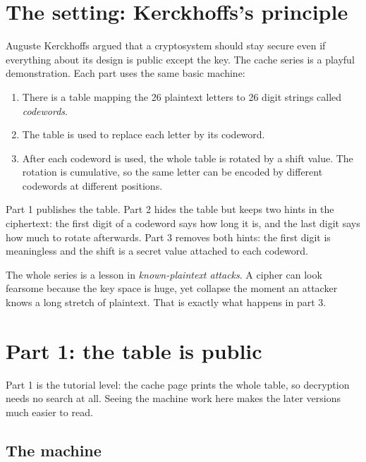 \documentclass[11pt]{article}
\begin{document}
\section{The setting: Kerckhoffs's principle}\label{sec:setting}

Auguste Kerckhoffs argued that a cryptosystem should stay secure even if
everything about its design is public except the key.  The cache series is a
playful demonstration.  Each part uses the same basic machine:

\begin{enumerate}[label=\arabic*.]
  \item There is a table mapping the 26 plaintext letters to 26 digit strings
        called \emph{codewords}.
  \item The table is used to replace each letter by its codeword.
  \item After each codeword is used, the whole table is rotated by a shift
        value.  The rotation is cumulative, so the same letter can be encoded
        by different codewords at different positions.
\end{enumerate}

Part 1 publishes the table.  Part 2 hides the table but keeps two hints in the
ciphertext: the first digit of a codeword says how long it is, and the last
digit says how much to rotate afterwards.  Part 3 removes both hints: the
first digit is meaningless and the shift is a secret value attached to each
codeword.

\begin{keyidea}
The whole series is a lesson in \emph{known-plaintext attacks}.  A cipher can
look fearsome because the key space is huge, yet collapse the moment an
attacker knows a long stretch of plaintext.  That is exactly what happens in
part 3.
\end{keyidea}

\section{Part 1: the table is public}\label{sec:part1}

Part 1 is the tutorial level: the cache page prints the whole table, so
decryption needs no search at all.  Seeing the machine work here makes the
later versions much easier to read.

\subsection{The machine}
\end{document}
